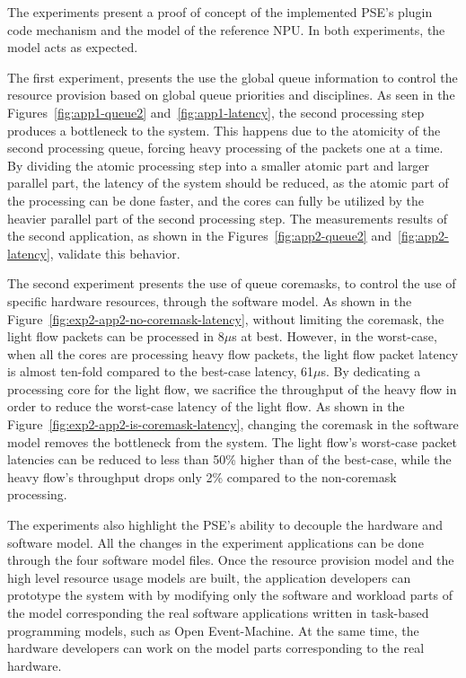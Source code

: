 
The experiments present a proof of concept of the implemented PSE's plugin code mechanism and the model of the reference NPU. In both experiments, the model acts as expected.

The first experiment, presents the use the global queue information to control the resource provision based on global queue priorities and disciplines. As seen in the Figures~\ref{fig:app1-queue2} and~\ref{fig:app1-latency}, the second processing step produces a bottleneck to the system. This happens due to the atomicity of the second processing queue, forcing heavy processing of the packets one at a time. By dividing the atomic processing step into a smaller atomic part and larger parallel part, the latency of the system should be reduced, as the atomic part of the processing can be done faster, and the cores can fully be utilized by the heavier parallel part of the second processing step. The measurements results of the second application, as shown in the Figures~\ref{fig:app2-queue2} and~\ref{fig:app2-latency}, validate this behavior.

The second experiment presents the use of queue coremasks, to control the use of specific hardware resources, through the software model. As shown in the Figure~\ref{fig:exp2-app2-no-coremask-latency}, without limiting the coremask, the light flow packets can be processed in 8$\mu$s at best. However, in the worst-case, when all the cores are processing heavy flow packets, the light flow packet latency is almost ten-fold compared to the best-case latency, 61$\mu$s. By dedicating a processing core for the light flow, we sacrifice the throughput of the heavy flow in order to reduce the worst-case latency of the light flow. As shown in the Figure~\ref{fig:exp2-app2-is-coremask-latency}, changing the coremask in the software model removes the bottleneck from the system. The light flow's worst-case packet latencies can be reduced to less than 50\% higher than of the best-case, while the heavy flow's throughput drops only 2\% compared to the non-coremask processing.

The experiments also highlight the PSE's ability to decouple the hardware and software model. All the changes in the experiment applications can be done through the four software model files. Once the resource provision model and the high level resource usage models are built, the application developers can prototype the system with by modifying only the software and workload parts of the model corresponding the real software applications written in task-based programming models, such as Open Event-Machine. At the same time, the hardware developers can work on the model parts corresponding to the real hardware.

